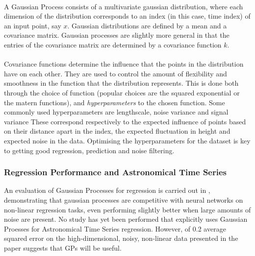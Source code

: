 \documentclass[11pt]{article}
\begin{document}
	\paragraph{}
	A Gaussian Process consists of a multivariate gaussian distribution, where each dimension of the distribution corresponds to an index (in this case, time index) of an input point, say $x$. Gaussian distributions are defined by a mean and a covariance matrix. Gaussian processes are slightly more general in that the entries of the covariance matrix are determined by a covariance function $k$. 
	\paragraph{}
	Covariance functions determine the influence that the points in the distribution have on each other. They are used to control the amount of flexibility and smoothness in the function that the distribution represents. This is done both through the choice of function (popular choices are the squared exponential or the matern functions), and \emph{hyperparameters} to the chosen function. Some commonly used hyperparameters are lengthscale, noise variance and signal variance These correspond respectively to the expected influence of points based on their distance apart in the index, the expected fluctuation in height and expected noise in the data. Optimising the hyperparameters for the dataset is key to getting good regression, prediction and noise filtering.
	
	\subsubsection{Regression Performance and Astronomical Time Series}
	An evaluation of Gaussian Processes for regression is carried out in \citep{rasmussen1996evaluation}, demonstrating that gaussian processes are competitive with neural networks on non-linear regression tasks, even performing slightly better when large amounts of noise are present. No study has yet been performed that explicitly uses Gaussian Proesses for Astronomical Time Series regression. However, of 0.2 average squared error on the high-dimensional, noisy, non-linear data presented in the paper suggests that GPs will be useful.
	
\end{document}
